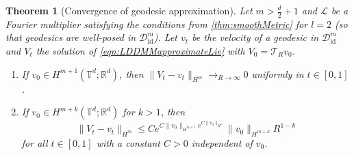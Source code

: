 \documentclass[a4paper, 12pt]{article}
\newtheorem{theorem}{Theorem}
\newcommand{\R}{\mathbb{R}}
\newcommand{\T}{\mathbb{T}}
\newcommand{\id}{\mathrm{id}}
\newcommand{\DiffSobId}{\mathcal D_{\id}}
\renewcommand{\L}{\mathcal{L}}
\newcommand{\trunc}[1][R]{\mathcal{T}_{#1}}
\begin{document}
\begin{theorem}[Convergence of geodesic approximation]\label{thm:convergence}
Let $m>\frac d2+1$ and $\L$ be a Fourier multiplier satisfying the conditions from \cref{thm:smoothMetric} for $l=2$ (so that geodesics are well-posed in $\DiffSobId^m$).
Let $v_t$ be the velocity of a geodesic in $\DiffSobId^m$ and $V_t$ the solution of \eqref{eqn:LDDMMapproximateLie} with $V_0=\trunc v_0$.
\begin{enumerate}
\item
If $v_0\in H^{m+1}(\T^d;\R^d)$, then $\|V_t-v_t\|_{H^m}\to_{R\to\infty}0$ uniformly in $t\in[0,1]$.
\item
If $v_0\in H^{m+k}(\T^d;\R^d)$ for $k>1$, then
\begin{equation*}
\|V_t-v_t\|_{H^m}\leq Ce^{C\|v_0\|_{H^{m+1}}e^{C\|v_0\|_{H^m}}}\|v_0\|_{H^{m+k}}R^{1-k}
\end{equation*}
for all $t\in[0,1]$ with a constant $C>0$ independent of $v_0$.
\end{enumerate}
\end{theorem}
\end{document}
